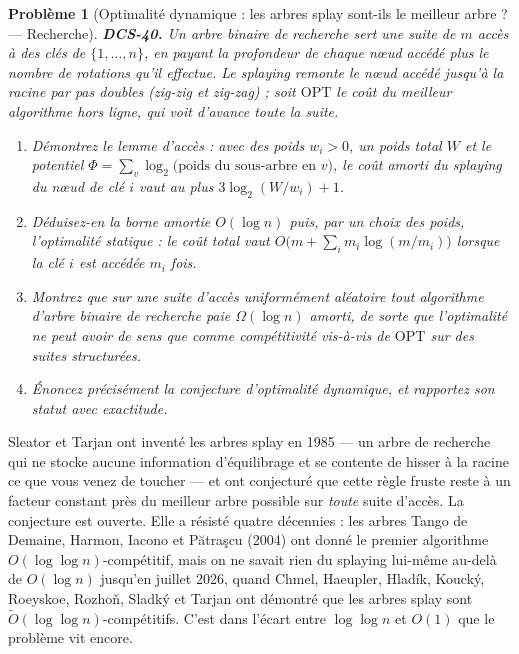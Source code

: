\documentclass[11pt]{article}
\newtheorem{problem}{Problème}
\begin{document}
\bigskip

\begin{problem}[{Optimalité dynamique : les arbres splay sont-ils le meilleur arbre ? --- Recherche}]
\textbf{DCS-40.} Un arbre binaire de recherche sert une suite de $m$ accès à des clés de $\{1,\dots,n\}$, en payant la profondeur de chaque n\oe{}ud accédé plus le nombre de rotations qu'il effectue. Le splaying remonte le n\oe{}ud accédé jusqu'à la racine par pas doubles (zig-zig et zig-zag) ; soit $\mathrm{OPT}$ le coût du meilleur algorithme \textit{hors ligne}, qui voit d'avance toute la suite.
\begin{enumerate}
\item[(a)] Démontrez le lemme d'accès : avec des poids $w_i > 0$, un poids total $W$ et le potentiel $\Phi = \sum_v \log_2 \big(\text{poids du sous-arbre en } v\big)$, le coût amorti du splaying du n\oe{}ud de clé $i$ vaut au plus $3\log_2 (W/w_i) + 1$.
\item[(b)] Déduisez-en la borne amortie $O(\log n)$ puis, par un choix des poids, l'optimalité statique : le coût total vaut $O\big(m + \sum_i m_i \log (m/m_i)\big)$ lorsque la clé $i$ est accédée $m_i$ fois.
\item[(c)] Montrez que sur une suite d'accès uniformément aléatoire tout algorithme d'arbre binaire de recherche paie $\Omega(\log n)$ amorti, de sorte que l'optimalité ne peut avoir de sens que comme compétitivité vis-à-vis de $\mathrm{OPT}$ sur des suites structurées.
\item[(d)] Énoncez précisément la conjecture d'optimalité dynamique, et rapportez son statut avec exactitude.
\end{enumerate}

\end{problem}

\noindent Sleator et Tarjan ont inventé les arbres splay en 1985 --- un arbre de recherche qui ne stocke aucune information d'équilibrage et se contente de hisser à la racine ce que vous venez de toucher --- et ont conjecturé que cette règle fruste reste à un facteur constant près du meilleur arbre possible sur \textit{toute} suite d'accès. La conjecture est ouverte. Elle a résisté quatre décennies : les arbres Tango de Demaine, Harmon, Iacono et P\u{a}tra\c{s}cu (2004) ont donné le premier algorithme $O(\log \log n)$-compétitif, mais on ne savait rien du splaying lui-même au-delà de $O(\log n)$ jusqu'en juillet 2026, quand Chmel, Haeupler, Hladík, Koucký, Roeyskoe, Rozho\v{n}, Sladký et Tarjan ont démontré que les arbres splay sont $\tilde{O}(\log \log n)$-compétitifs. C'est dans l'écart entre $\log \log n$ et $O(1)$ que le problème vit encore.
\end{document}
